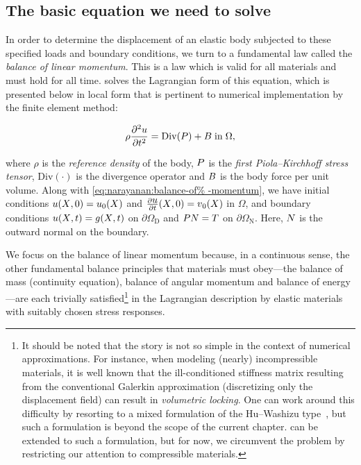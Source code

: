 \subsection{The basic equation we need to solve}

In order to determine the displacement of an elastic body subjected to
these specified loads and boundary conditions, we turn to a
fundamental law called the {\em balance of linear momentum}. This is a
law which is valid for all materials and must hold for all
time. \twist{} solves the Lagrangian form of this equation, which is
presented below in local form that is pertinent to numerical
implementation by the finite element method:

\begin{equation}
  \rho \frac{\partial^{2} \mbox{$ u$}}{\partial t^{2}} = \mathrm{Div}(\mbox{$ P$})
  + \mbox{$ B$}\; \mathrm{in}\; \Omega,
  \label{eq:narayanan:balance-of-momentum}
\end{equation}

\noindent where $\rho$ is the {\em reference density} of the body,
$\mbox{$ P$}$ is the {\em first Piola--Kirchhoff stress tensor}, $\mathrm{Div}
(\cdot)$ is the divergence operator and $\mbox{$ B$}$ is the body force per
unit volume. Along with \eqref{eq:narayanan:balance-of%
-momentum}, we have initial conditions $\mbox{$ u$}(\mbox{$ X$}, 0) = \mbox{$ u$}_{0}(\mbox{$ X$})$
and $\frac{\partial\mbox{$ u$}}{\partial t}(\mbox{$ X$}, 0) = \mbox{$ v$}_{0}(\mbox{$ X$})$ in
$\Omega$, and boundary conditions $\mbox{$ u$}(\mbox{$ X$}, t) = \mbox{$ g$}(\mbox{$ X$}, t)$ on
$\partial\Omega_{\mathrm{D}}$ and $\mbox{$ P$} \mbox{$ N$} = \mbox{$ T$}$ on
$\partial\Omega_{\mathrm{N}}$. Here, $\mbox{$ N$}$ is the outward normal
on the boundary.

We focus on the balance of linear momentum because, in a continuous
sense, the other fundamental balance principles that materials must
obey---the balance of mass (continuity equation), balance of angular
momentum and balance of energy---are each trivially
satisfied\footnote{It should be noted that the story is not
  so simple in the context of numerical approximations. For instance,
  when modeling (nearly) incompressible materials, it is well known
  that the ill-conditioned stiffness matrix resulting from the
  conventional Galerkin approximation (discretizing only the
  displacement field) can result in {\em volumetric locking}. One can
  work around this difficulty by resorting to a mixed formulation of
  the Hu--Washizu type~\citep{SimoHughes1998}, but such a formulation
  is beyond the scope of the current chapter. \twist{} can be extended
  to such a formulation, but for now, we circumvent the problem by
  restricting our attention to compressible materials.} in the
Lagrangian description by elastic materials with suitably chosen
stress responses.

